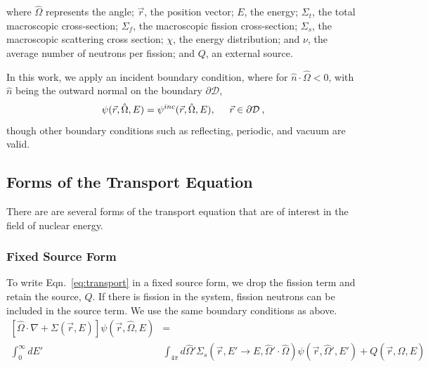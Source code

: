 where $\hat{\Omega}$ represents the angle; $\vec{r}$, the position vector; $E$, the energy; $\Sigma_t$, the total macroscopic cross-section; $\Sigma_f$, the macroscopic fission cross-section; $\Sigma_s$, the macroscopic scattering cross section; $\chi$, the energy distribution; and $\nu$, the average number of neutrons per fission; and $Q$, an external source.  


In this work, we apply an incident boundary condition, where for $\hat{n} \cdot \hat{\Omega} < 0$, with $\hat{n}$ being the outward normal on the boundary $\partial \mathcal{D}$,
\begin{equation}
    \psi(\vec{r}, \hat{\Omega}, E) = \psi^{inc}(\vec{r}, \hat{\Omega}, E), \hspace{5mm} \vec{r} \in \partial \mathcal{D}\:,
\end{equation}
though other boundary conditions such as reflecting, periodic, and vacuum are valid.

\subsection{Forms of the Transport Equation}
There are are several forms of the transport equation that are of interest in the field of nuclear energy. 

\subsubsection{Fixed Source Form}
To write Eqn.~\eqref{eq:transport} in a fixed source form, we drop the fission term and retain the source, $Q$. If there is fission in the system, fission neutrons can be included in the source term. We use the same boundary conditions as above. 
%
\begin{equation}
\begin{split}
 [\hat{\Omega} \cdot \nabla + \Sigma(\vec{r}, E)]\psi(\vec{r}, \hat{\Omega}, E) &= \\ \int_0^\infty dE' &\int_{4\pi} d\hat{\Omega}' \Sigma_s(\vec{r}, E' \rightarrow E, \hat{\Omega}' \cdot \hat{\Omega})\psi(\vec{r}, \hat{\Omega}', E')  + Q(\vec{r}, \hat{\Omega}, E)
\end{split}
 \label{eq:transport_fixed_source}
\end{equation}

